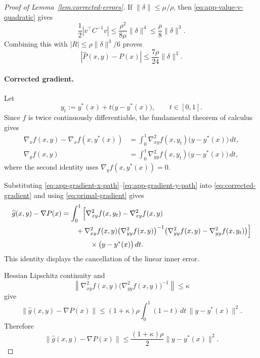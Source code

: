 \begin{proof}[Proof of Lemma~\ref{lem:corrected-errors}]
If $\|\delta\|\le\mu/\rho$, then
\eqref{eq:app-value-v-quadratic} gives
\[
    \frac12|v^\top C^{-1}v|
    \le
    \frac{\rho^2}{8\mu}\|\delta\|^4
    \le
    \frac{\rho}{8}\|\delta\|^3.
\]
Combining this with
$|R|\le\rho\|\delta\|^3/6$ proves
\[
    |\widehat P(x,y)-P(x)|
    \le
    \frac{7\rho}{24}\|\delta\|^3.
\]


\paragraph{Corrected gradient.}
Let
\[
    y_t
    :=
    y^*(x)+t\bigl(y-y^*(x)\bigr),
    \qquad
    t\in[0,1].
\]
Since $f$ is twice continuously differentiable, the fundamental
theorem of calculus gives
\begin{align}
    \nabla_xf(x,y)-\nabla_xf(x,y^*(x))
    &=
    \int_0^1
    \nabla^2_{xy}f(x,y_t)
    \bigl(y-y^*(x)\bigr)\,dt,
    \label{eq:app-gradient-x-path}
    \\
    \nabla_yf(x,y)
    &=
    \int_0^1
    \nabla^2_{yy}f(x,y_t)
    \bigl(y-y^*(x)\bigr)\,dt,
    \label{eq:app-gradient-y-path}
\end{align}
where the second identity uses
$\nabla_yf(x,y^*(x))=0$.

Substituting
\eqref{eq:app-gradient-x-path}--\eqref{eq:app-gradient-y-path}
into \eqref{eq:corrected-gradient} and using
\eqref{eq:primal-gradient} gives
\begin{align}
    \widehat g(x,y)-\nabla P(x)
    &=
    \int_0^1
    \Big[
        \nabla^2_{xy}f(x,y_t)
        -
        \nabla^2_{xy}f(x,y)
        \notag\\
    &\qquad
        +
        \nabla^2_{xy}f(x,y)
        \bigl(\nabla^2_{yy}f(x,y)\bigr)^{-1}
        \bigl(
            \nabla^2_{yy}f(x,y)
            -
            \nabla^2_{yy}f(x,y_t)
        \bigr)
    \Big]
    \notag\\
    &\qquad\qquad\times
    \bigl(y-y^*(x)\bigr)\,dt.
    \label{eq:app-gradient-cancellation}
\end{align}
This identity displays the cancellation of the linear inner error.

Hessian Lipschitz continuity and
\[
    \left\|
    \nabla^2_{xy}f(x,y)
    \bigl(\nabla^2_{yy}f(x,y)\bigr)^{-1}
    \right\|
    \le
    \kappa
\]
give
\[
    \|\widehat g(x,y)-\nabla P(x)\|
    \le
    (1+\kappa)\rho
    \int_0^1(1-t)\,dt\,
    \|y-y^*(x)\|^2.
\]
Therefore
\[
    \|\widehat g(x,y)-\nabla P(x)\|
    \le
    \frac{(1+\kappa)\rho}{2}
    \|y-y^*(x)\|^2.
\]



\end{proof}
